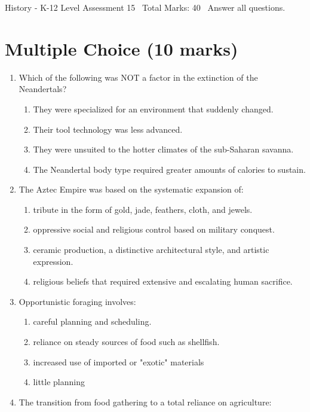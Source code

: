 \documentclass[12pt]{article}
\begin{document}
\begin{center}
History - K-12 Level Assessment 15 \
Total Marks: 40 \
Answer all questions.
\end{center}

\section*{Multiple Choice (10 marks)}
\begin{enumerate}[label=\arabic*.]
\item Which of the following was NOT a factor in the extinction of the Neandertals?
\begin{enumerate}[label=(\alph*)]
    \item They were specialized for an environment that suddenly changed.
    \item Their tool technology was less advanced.
    \item They were unsuited to the hotter climates of the sub-Saharan savanna.
    \item The Neandertal body type required greater amounts of calories to sustain.
\end{enumerate}
\item The Aztec Empire was based on the systematic expansion of:
\begin{enumerate}[label=(\alph*)]
    \item tribute in the form of gold, jade, feathers, cloth, and jewels.
    \item oppressive social and religious control based on military conquest.
    \item ceramic production, a distinctive architectural style, and artistic expression.
    \item religious beliefs that required extensive and escalating human sacrifice.
\end{enumerate}
\item Opportunistic foraging involves:
\begin{enumerate}[label=(\alph*)]
    \item careful planning and scheduling.
    \item reliance on steady sources of food such as shellfish.
    \item increased use of imported or "exotic" materials
    \item little planning
\end{enumerate}
\item The transition from food gathering to a total reliance on agriculture:

\end{enumerate}
\end{document}
